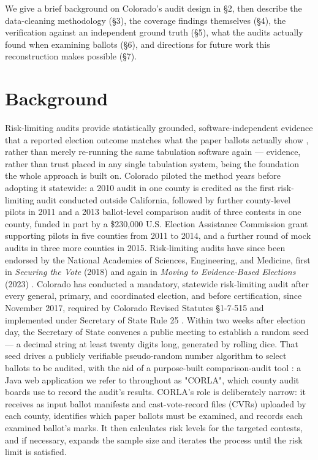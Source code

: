 We give a brief background on Colorado's audit design in §2, then
describe the data-cleaning methodology (§3), the coverage findings
themselves (§4), the verification against an independent ground truth
(§5), what the audits actually found when examining ballots (§6), and
directions for future work this reconstruction makes possible (§7).

\section{Background}

Risk-limiting audits provide statistically grounded, software-independent
evidence that a reported election outcome matches what the paper ballots
actually show \cite{stark2012evidence}, rather than merely re-running the
same tabulation software again \cite{lindeman2013retabulation} — evidence,
rather than trust placed in any single tabulation system, being the
foundation the whole approach is built on. Colorado piloted the method
years before adopting it statewide: a 2010 audit in one county is credited
as the first risk-limiting audit conducted outside California, followed by
further county-level pilots in 2011 and a 2013 ballot-level comparison
audit of three contests in one county, funded in part by a \$230,000 U.S.
Election Assistance Commission grant supporting pilots in five counties
from 2011 to 2014, and a further round of mock audits in three more
counties in 2015. Risk-limiting audits have since been endorsed by the
National Academies of Sciences, Engineering, and Medicine, first in
\textit{Securing the Vote} (2018) and again in \textit{Moving to Evidence-Based
Elections} (2023) \cite{nas2018securing, nas2023moving}. Colorado has
conducted a mandatory, statewide risk-limiting audit after every general,
primary, and coordinated election, and before certification, since
November 2017, required by Colorado Revised Statutes \S 1-7-515
\cite{corstatute} and implemented under Secretary of State Rule 25
\cite{corules2026}. Within two weeks after election day,
the Secretary of State convenes a public meeting to establish a random seed
— a decimal string at least twenty digits long, generated by rolling dice.
That seed drives a publicly verifiable pseudo-random number algorithm to
select ballots to be audited, with the aid of a purpose-built comparison-audit tool \cite{corlasoftware}: a Java
web application we refer to throughout as "CORLA", which county audit boards use to record the audit's results.
CORLA's role is deliberately narrow: it receives as input ballot manifests and
cast-vote-record files (CVRs) uploaded by each county, identifies which paper ballots
must be examined, and records each examined ballot's marks. It then calculates
risk levels for the targeted contests, and if necessary, expands the sample size
and iterates the process until the risk limit is satisfied.

